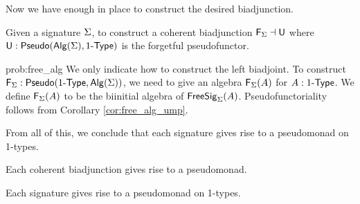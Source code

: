 Now we have enough in place to construct the desired biadjunction.

\begin{problem}
\label{prob:free_alg}
Given a signature $\Sigma$, to construct a coherent biadjunction $\mathsf{F}_{\Sigma} \dashv \mathsf{U}$ where $\mathsf{U} : \mathsf{Pseudo}(\mathsf{Alg}(\Sigma), 1\mbox{-}\mathsf{Type})$ is the forgetful pseudofunctor.
\end{problem}

\begin{construction}{prob:free_alg}
We only indicate how to construct the left biadjoint.
To construct $\mathsf{F}_{\Sigma} : \mathsf{Pseudo}(1\mbox{-}\mathsf{Type}, \mathsf{Alg}(\Sigma))$, we need to give an algebra $\mathsf{F}_{\Sigma}(A)$ for $A : 1\mbox{-}\mathsf{Type}$.
We define $\mathsf{F}_{\Sigma}(A)$ to be the biinitial algebra of $\mathsf{FreeSig}_{\Sigma}(A)$.
Pseudofunctoriality follows from Corollary \ref{cor:free_alg_ump}.
\end{construction}

From all of this, we conclude that each signature gives rise to a pseudomonad on 1-types.

\begin{proposition}
Each coherent biadjunction gives rise to a pseudomonad.
\end{proposition}

\begin{corollary}
\label{cor:pseudomonadofsig}
Each signature gives rise to a pseudomonad on 1-types.
\end{corollary}
